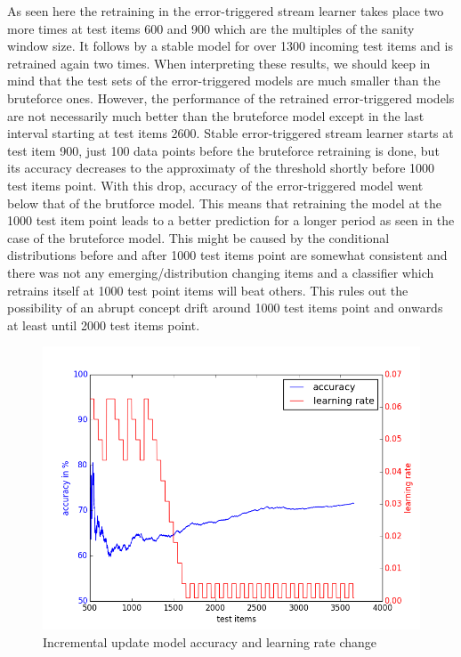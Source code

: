 \documentclass{article} %
\begin{document}
As seen here the retraining in the error-triggered stream learner takes place two more times at test items 600 and 900 which are the multiples of the sanity window size. It follows by a stable model for over 1300 incoming test items and is retrained again two times. When interpreting these results, we should keep in mind that the test sets of the error-triggered models are much smaller than the bruteforce ones. However, the performance of the retrained error-triggered models are not necessarily much better than the bruteforce model except in the last interval starting at test items 2600. Stable error-triggered stream learner starts at test item 900, just 100 data points before the bruteforce retraining is done, but its accuracy decreases to the approximaty of the threshold shortly before 1000 test items point. With this drop, accuracy of the error-triggered model went below that of the brutforce model. This means that retraining the model at the 1000 test item point leads to a better prediction for a longer period as seen in the case of the bruteforce model. This might be caused by the conditional distributions before and after 1000 test items point are somewhat consistent and there was not any emerging/distribution changing items and a classifier which retrains itself at 1000 test point items will beat others. This rules out the possibility of an abrupt concept drift around 1000 test items point and onwards at least until 2000 test items point.  

 \begin{figure}[htbp]
  \centering
  \includegraphics[scale=0.5]{./plots/incremental_plot.png}
  \caption{Incremental update model accuracy and learning rate change}
\end{figure}
\end{document}
